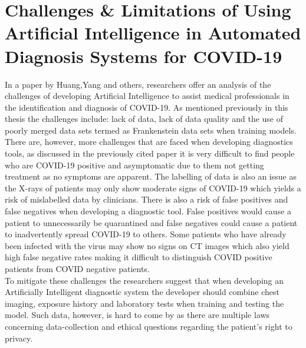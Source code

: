 \section{Challenges \& Limitations of Using Artificial Intelligence in Automated Diagnosis Systems for COVID-19}
In a paper by Huang,Yang and others, researchers offer an analysis of the challenges of developing Artificial Intelligence to assist medical professionals in the identification and diagnosis of COVID-19.  As mentioned previously in this thesis the challenges include: lack of data, lack of data quality and the use of poorly merged data sets termed as Frankenstein data sets when training models. There are, however, more challenges that are faced when developing diagnostics tools, as discussed in the previously cited paper\cite{litReviewCnnLstm} it is very difficult to find people who are COVID-19 positive and asymptomatic due to them not getting treatment as no symptoms are apparent.  The labelling of data is also an issue as the X-rays of patients may only show moderate signs of COVID-19 which yields a risk of mislabelled data by clinicians.  There is also a risk of false positives and false negatives when developing a diagnostic tool.  False positives would cause a patient to unnecessarily be quarantined and false negatives could cause a patient to inadvertently spread COVID-19 to others.  Some patients who have already been infected with the virus may show no signs on CT images which also yield high false negative rates making it difficult to distinguish COVID positive patients from COVID negative patients.  
\\
To mitigate these challenges the researchers suggest that when developing an Artificially Intelligent diagnostic system the developer should combine chest imaging, exposure history and laboratory tests when training and testing the model.  Such data, however, is hard to come by as there are multiple laws concerning data-collection and ethical questions regarding the patient's right to privacy.   
